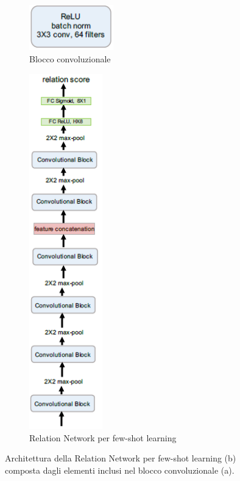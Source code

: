 \documentclass[12pt,a4paper,titlepage]{article}
\begin{document}
\begin{figure}[h]
	\centering
	\begin{subfigure}{.4\textwidth}
	 \centering
	 \includegraphics[width=0.4\textwidth]{Immagini/relation_network_conv_block}
	 \caption{Blocco convoluzionale}
	 \label{fig:relation_network_architecture_a}
	\end{subfigure}
	\qquad
	\begin{subfigure}{.4\textwidth}
    \centering
	\includegraphics[width=0.35\textwidth]{Immagini/relation_network_architecture}
	\caption{Relation Network per few-shot learning}
	\label{fig:relation_network_architecture_b}
	\end{subfigure}
	\caption{Architettura della Relation Network per few-shot learning (b) composta dagli elementi inclusi nel blocco convoluzionale (a).~\cite{DBLP:journals/corr/abs-1711-06025}}
	\label{fig:relation_network_architecture}	
\end{figure}
\end{document}
